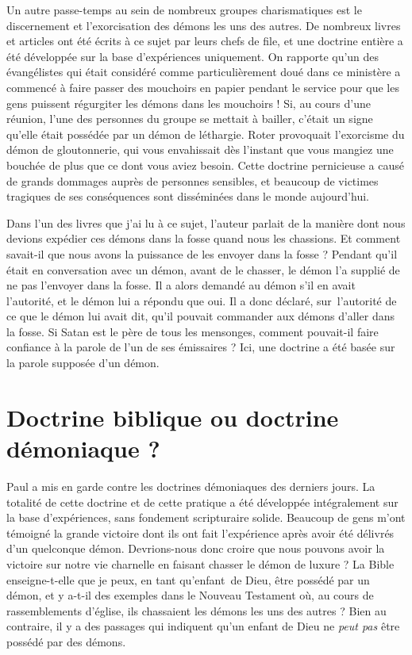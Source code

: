 Un autre passe-temps au sein de nombreux groupes charismatiques
 est le discernement et l'exorcisation des démons les uns des autres.
 De nombreux livres et articles ont été écrits à ce sujet par leurs chefs de file,
 et une doctrine entière a été développée sur la base d'expériences
 uniquement. On rapporte qu'un des évangélistes qui était considéré
 comme particulièrement doué dans ce ministère a commencé à faire passer
 des mouchoirs en papier pendant le service pour que les gens puissent
 régurgiter les démons dans les mouchoirs ! Si, au cours d'une réunion,
 l'une des personnes du groupe se mettait à bailler, c'était un signe
 qu'elle était possédée par un démon de léthargie. Roter provoquait
 l'exorcisme du démon de gloutonnerie, qui vous envahissait dès l'instant
 que vous mangiez une bouchée de plus que ce dont vous aviez besoin.
 Cette doctrine pernicieuse a causé de grands dommages auprès de personnes
 sensibles, et beaucoup de victimes tragiques de ses conséquences
 sont disséminées dans le monde aujourd'hui.

Dans l'un des livres que j'ai lu à ce sujet, l'auteur parlait
 de la manière dont nous devions expédier ces démons dans la fosse
 quand nous les chassions. Et comment savait-il que nous avons la puissance
 de les envoyer dans la fosse ? Pendant qu'il était en conversation
 avec un démon, avant de le chasser, le démon l'a supplié de ne pas
 l'envoyer dans la fosse. Il a alors demandé au démon s'il en avait
 l'autorité, et le démon lui a répondu que oui.
 Il a donc déclaré, sur~l'autorité de ce que le démon lui avait dit,
 qu'il pouvait commander aux démons d'aller dans la fosse.
 Si Satan  est le père de tous les mensonges,
 comment pouvait-il faire
 confiance à la parole de l'un de ses émissaires ?
 Ici, une doctrine a été basée sur la parole supposée d'un démon.


\section{Doctrine biblique ou doctrine d\'emoniaque ?}

Paul a mis en garde contre les doctrines démoniaques des derniers jours.
 La totalité de cette doctrine et de cette pratique a été développée intégralement
 sur la base d'expériences, sans fondement scripturaire solide.
 Beaucoup de gens m'ont témoigné la grande victoire dont ils ont fait
 l'expérience après avoir été délivrés d'un quelconque démon.
 Devrions-nous donc croire que nous pouvons avoir la victoire
 sur notre vie charnelle en faisant chasser le démon de luxure ?
 La Bible enseigne-t-elle que je peux, en tant qu'enfant~de Dieu,
 être possédé par un démon, et y a-t-il des exemples dans le Nouveau
 Testament où, au cours de rassemblements d'église, ils chassaient
 les démons les uns des autres ? Bien au contraire, il y a des passages
 qui indiquent qu'un enfant de Dieu ne \emph{peut pas} être possédé par des démons.

